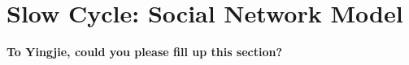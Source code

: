 \section{Slow Cycle: Social Network Model}\label{sec:slowCycle}

{\bf To Yingjie, could you please fill up this section?}